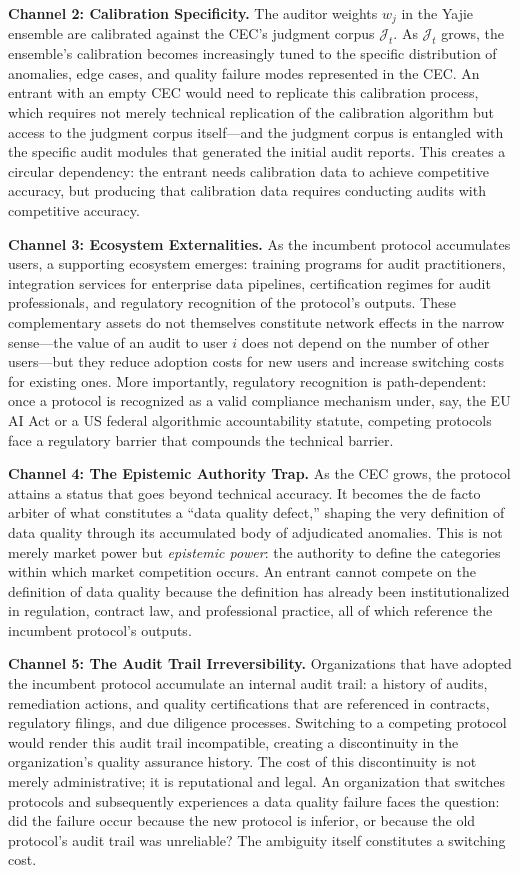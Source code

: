 \documentclass[12pt,a4paper]{ctexart}
\theoremstyle{definition}
\theoremstyle{remark}
\begin{document}
\textbf{Channel 2: Calibration Specificity.} The auditor weights $w_j$ in the Yajie ensemble are calibrated against the CEC's judgment corpus $\mathcal{J}_t$. As $\mathcal{J}_t$ grows, the ensemble's calibration becomes increasingly tuned to the specific distribution of anomalies, edge cases, and quality failure modes represented in the CEC. An entrant with an empty CEC would need to replicate this calibration process, which requires not merely technical replication of the calibration algorithm but access to the judgment corpus itself—and the judgment corpus is entangled with the specific audit modules that generated the initial audit reports. This creates a circular dependency: the entrant needs calibration data to achieve competitive accuracy, but producing that calibration data requires conducting audits with competitive accuracy.

\textbf{Channel 3: Ecosystem Externalities.} As the incumbent protocol accumulates users, a supporting ecosystem emerges: training programs for audit practitioners, integration services for enterprise data pipelines, certification regimes for audit professionals, and regulatory recognition of the protocol's outputs. These complementary assets do not themselves constitute network effects in the narrow sense—the value of an audit to user $i$ does not depend on the number of other users—but they reduce adoption costs for new users and increase switching costs for existing ones. More importantly, regulatory recognition is path-dependent: once a protocol is recognized as a valid compliance mechanism under, say, the EU AI Act or a US federal algorithmic accountability statute, competing protocols face a regulatory barrier that compounds the technical barrier.

\textbf{Channel 4: The Epistemic Authority Trap.} As the CEC grows, the protocol attains a status that goes beyond technical accuracy. It becomes the de facto arbiter of what constitutes a ``data quality defect,'' shaping the very definition of data quality through its accumulated body of adjudicated anomalies. This is not merely market power but \textit{epistemic power}: the authority to define the categories within which market competition occurs. An entrant cannot compete on the definition of data quality because the definition has already been institutionalized in regulation, contract law, and professional practice, all of which reference the incumbent protocol's outputs.

\textbf{Channel 5: The Audit Trail Irreversibility.} Organizations that have adopted the incumbent protocol accumulate an internal audit trail: a history of audits, remediation actions, and quality certifications that are referenced in contracts, regulatory filings, and due diligence processes. Switching to a competing protocol would render this audit trail incompatible, creating a discontinuity in the organization's quality assurance history. The cost of this discontinuity is not merely administrative; it is reputational and legal. An organization that switches protocols and subsequently experiences a data quality failure faces the question: did the failure occur because the new protocol is inferior, or because the old protocol's audit trail was unreliable? The ambiguity itself constitutes a switching cost.
\end{document}
